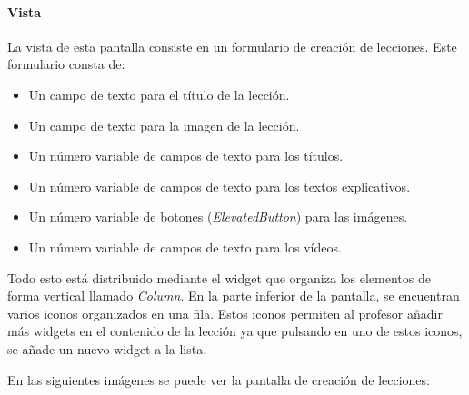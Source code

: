\paragraph*{Vista}
La vista de esta pantalla consiste en un formulario de creación de lecciones. Este formulario consta de:
\begin{itemize}
  \item Un campo de texto para el título de la lección.
  \item Un campo de texto para la imagen de la lección.
  \item Un número variable de campos de texto para los títulos.
  \item Un número variable de campos de texto para los textos explicativos.
  \item Un número variable de botones (\textit{ElevatedButton}) para las imágenes.
  \item Un número variable de campos de texto para los vídeos.
\end{itemize}

Todo esto está distribuido mediante el widget que organiza los elementos de forma vertical llamado \textit{Column}. 
En la parte inferior de la pantalla, se encuentran varios iconos organizados en una fila. Estos iconos permiten al profesor añadir más widgets en el contenido de la lección
ya que pulsando en uno de estos iconos, se añade un nuevo widget a la lista.

En las siguientes imágenes se puede ver la pantalla de creación de lecciones:

